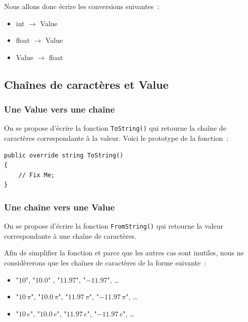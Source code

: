 \documentclass[12pt,a4paper]{report}
\begin{document}
Nous allons donc écrire les conversions suivantes~:
\begin{itemize}
	\item {\ttfamily int} $\rightarrow$ {\ttfamily Value}
	\item {\ttfamily float} $\rightarrow$ {\ttfamily Value}
	\item {\ttfamily Value} $\rightarrow$ {\ttfamily float}
\end{itemize}

\subsection{Chaînes de caractères et {\ttfamily Value}}

\subsubsection{Une {\ttfamily Value} vers une chaîne}

On se propose d'écrire la fonction \texttt{ToString()} qui retourne la chaîne de caractères correspondante à la valeur. Voici le prototype de la fonction~:

\begin{lstlisting}
public override string ToString()
{
	// Fix Me;
}
\end{lstlisting}


\subsubsection{Une chaîne vers une {\ttfamily Value}}

On se propose d'écrire la fonction \texttt{FromString()} qui retourne la valeur correspondante à une chaîne de caractères.

Afin de simplifier la fonction et parce que les autres cas sont inutiles, nous ne considèrerons que les chaînes de caractères de la forme suivante~:

\begin{itemize}
	\item "$10$", "$10.0$" , "$11.97$", "$-11.97$", \ldots
	\item "$10\,\pi$", "$10.0\,\pi$", "$11.97\,\pi$", "$-11.97\,\pi$", \ldots
	\item "$10\, e$", "$10.0\, e$", "$11.97\, e$", "$-11.97\, e$", \ldots
\end{itemize}
\end{document}
